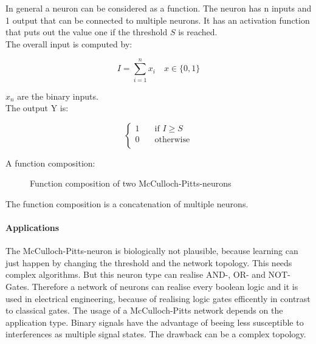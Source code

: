 \documentclass[10pt,a4paper,DIV=11]{scrreprt}
\begin{document}
In general a neuron can be considered as a function.
The neuron has n inputs and 1 output that can be connected to multiple neurons. It has an activation function that puts out the value one if the threshold $S$ is reached. \\

The overall input is computed by:

\begin{equation}
I = \sum_{i=1}^{n} x_{i} \quad  x \in \{0, 1\}
\end{equation}

$x_{n}$ are the binary inputs. \\

The output Y is:


\begin{equation}
\begin{cases}
1       & \quad \text{if } I  \geq S \\
0  & \quad \text{otherwise}\\
\end{cases}
\end{equation}

A function composition:

\begin{figure}[H]
	\centering
	\caption{Function composition of two McCulloch-Pitts-neurons}
	\label{fig:pitts2}
\end{figure}

The function composition is a concatenation of multiple neurons. \\

\paragraph*{Applications}
The McCulloch-Pitts-neuron is biologically not plausible, because learning
can just happen by changing the threshold and the network topology. This needs complex algorithms.
But this neuron type can realise AND-, OR- and NOT-Gates.
Therefore a network of neurons can realise every boolean logic and it is used in electrical engineering, because of realising logic gates efficently in contrast to classical gates. \cite{rojas}
The usage of a McCulloch-Pitts network depends on the application type. Binary signals have the advantage of beeing less susceptible to interferences as multiple signal states.
The drawback can be a complex topology.
\end{document}
